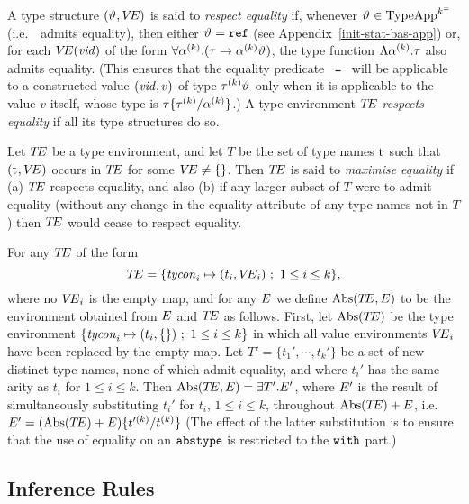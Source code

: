 A type structure $(\typeapp,\VE)$ is said to
{\sl respect equality} if, whenever $\typeapp\in\TypeApp[\keq]$ 
(i.e.\ \typeapp\ admits equality), then
either $\typeapp=\REF$ (see Appendix~\ref{init-stat-bas-app}) or,
for each $\VE(\vid)$ of the form 
$\forall\alphak.(\tau\rightarrow\alphak\typeapp)$,
the type function $\typetypefnc{\alphak}{\tau}$ also admits equality.
(This ensures that the equality
predicate ~{\tt =}~ will be applicable to a constructed value $(\vid,v)$ of
type $\tauk\typeapp$ only when it is applicable to the value $v$ itself,
whose type is $\tau\{\tauk/\alphak\}$.)
A type environment $\TE$ {\sl respects equality} if all its type
structures do so.

Let $\TE$ be a type environment, and let $T$ be the set of type names
$\t$ such that $(\t,\VE)$ occurs in $\TE$ for some
$\VE\neq\emptymap$.  Then $\TE$ is said to {\sl maximise equality}
if (a) $\TE$ respects equality, and also (b) if any larger subset of
$T$ were to admit equality (without any change in the equality
attribute of any type names not in $T$) then $\TE$ would cease to
respect equality.


For any $\TE$ of the form
\[\TE=\{\tycon_i\mapsto(t_i,\VE_i)\ ;\ 1\leq i\leq k\},\]
where no $\VE_i$ is the empty map, and for any $\E$ we define
$\Abs(\TE,\E)$ to be the environment obtained from 
$\E$ and $\TE$ as
follows. First, let $\Abs(\TE)$ be the type environment
$\{\tycon_i\mapsto(t_i,\emptymap)\ ;\ 1\leq i\leq k\}$
in which all value
environments $\VE_i$ have been replaced by the empty map. 
Let $T'=\{t_1',\cdots,t_k'\}$ be a set of new distinct type names,
 none of which admit equality,
and where  $t_i'$ has the same arity as $t_i$ for $1\leq i\leq k$.
Then $\Abs(\TE,\E)=\EXISTS{\T'}{\E'}$, where $\E'$ is the result of simultaneously
substituting
$t_i'$ for $t_i$, $1\leq i\leq k$,  throughout $\Abs(\TE)+\E$, i.e.\
$\E' = (\Abs(\TE)+\E)\{t'^{(k)}/ t^{(k)}\} $ 
(The effect of the latter substitution is to ensure that the use of 
equality on  an $\ABSTYPE$ is restricted to the $\WITH$ part.)
\label{abs-lab}


\subsection{Inference Rules}
\label{stat-cor-inf-rules}

